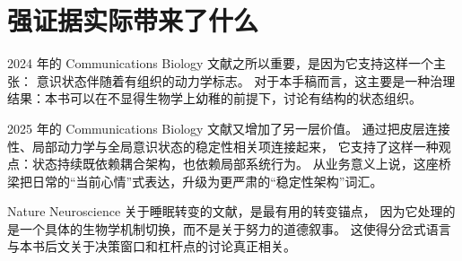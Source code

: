 \section{强证据实际带来了什么}

2024 年的 Communications Biology 文献之所以重要，是因为它支持这样一个主张：
意识状态伴随着有组织的动力学标志。
对于本手稿而言，这主要是一种治理结果：本书可以在不显得生物学上幼稚的前提下，讨论有结构的状态组织。

2025 年的 Communications Biology 文献又增加了另一层价值。
通过把皮层连接性、局部动力学与全局意识状态的稳定性相关项连接起来，
它支持了这样一种观点：状态持续既依赖耦合架构，也依赖局部系统行为。
从业务意义上说，这座桥梁把日常的“当前心情”式表达，升级为更严肃的“稳定性架构”词汇。

Nature Neuroscience 关于睡眠转变的文献，是最有用的转变锚点，
因为它处理的是一个具体的生物学机制切换，而不是关于努力的道德叙事。
这使得分岔式语言与本书后文关于决策窗口和杠杆点的讨论真正相关。